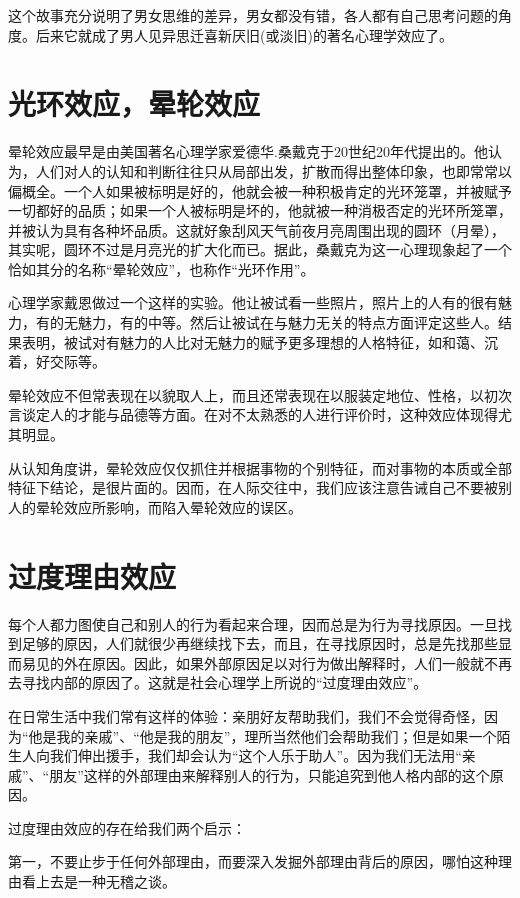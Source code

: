 \documentclass[11pt]{ctexart}
\begin{document}
这个故事充分说明了男女思维的差异，男女都没有错，各人都有自己思考问题的角度。后来它就成了男人见异思迁喜新厌旧(或淡旧)的著名心理学效应了。
\section{光环效应，晕轮效应}
\label{sec-41}


晕轮效应最早是由美国著名心理学家爱德华.桑戴克于20世纪20年代提出的。他认为，人们对人的认知和判断往往只从局部出发，扩散而得出整体印象，也即常常以偏概全。一个人如果被标明是好的，他就会被一种积极肯定的光环笼罩，并被赋予一切都好的品质；如果一个人被标明是坏的，他就被一种消极否定的光环所笼罩，并被认为具有各种坏品质。这就好象刮风天气前夜月亮周围出现的圆环（月晕），其实呢，圆环不过是月亮光的扩大化而已。据此，桑戴克为这一心理现象起了一个恰如其分的名称“晕轮效应”，也称作“光环作用”。

心理学家戴恩做过一个这样的实验。他让被试看一些照片，照片上的人有的很有魅力，有的无魅力，有的中等。然后让被试在与魅力无关的特点方面评定这些人。结果表明，被试对有魅力的人比对无魅力的赋予更多理想的人格特征，如和蔼、沉着，好交际等。

晕轮效应不但常表现在以貌取人上，而且还常表现在以服装定地位、性格，以初次言谈定人的才能与品德等方面。在对不太熟悉的人进行评价时，这种效应体现得尤其明显。

从认知角度讲，晕轮效应仅仅抓住并根据事物的个别特征，而对事物的本质或全部特征下结论，是很片面的。因而，在人际交往中，我们应该注意告诫自己不要被别人的晕轮效应所影响，而陷入晕轮效应的误区。
\section{过度理由效应}
\label{sec-42}


每个人都力图使自己和别人的行为看起来合理，因而总是为行为寻找原因。一旦找到足够的原因，人们就很少再继续找下去，而且，在寻找原因时，总是先找那些显而易见的外在原因。因此，如果外部原因足以对行为做出解释时，人们一般就不再去寻找内部的原因了。这就是社会心理学上所说的“过度理由效应”。

在日常生活中我们常有这样的体验：亲朋好友帮助我们，我们不会觉得奇怪，因为“他是我的亲戚”、“他是我的朋友”，理所当然他们会帮助我们；但是如果一个陌生人向我们伸出援手，我们却会认为“这个人乐于助人”。因为我们无法用“亲戚”、“朋友”这样的外部理由来解释别人的行为，只能追究到他人格内部的这个原因。

过度理由效应的存在给我们两个启示：

第一，不要止步于任何外部理由，而要深入发掘外部理由背后的原因，哪怕这种理由看上去是一种无稽之谈。
\end{document}
